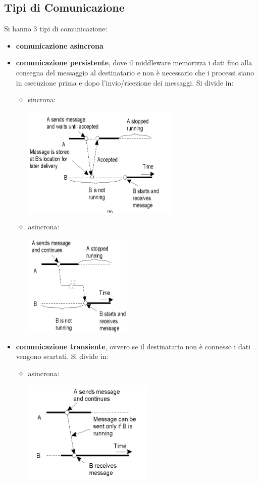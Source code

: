 \message{ !name(sd.tex)}\documentclass[a4paper,12pt, oneside]{book}
\begin{document}
\subsection{Tipi di Comunicazione}
Si hanno 3 tipi di comunicazione:
\begin{itemize}
	\item \textbf{comunicazione asincrona}
	\item \textbf{comunicazione persistente}, dove il middleware memorizza i dati fino alla consegna del messaggio al destinatario e non è necessario che i processi siano in esecuzione prima e dopo l'invio/ricezione dei messaggi. Si divide in:
	\begin{itemize}
		\item sincrona:
		\begin{center}
			\includegraphics[scale=0.8]{img/sin.png}
        \end{center}
		\item asincrona:
		\begin{center}
			\includegraphics[scale=0.8]{img/asin.png}
		\end{center}
	\end{itemize}
	\item \textbf{comunicazione transiente}, ovvero se il destinatario non è connesso i dati vengono scartati. Si divide in:
	\begin{itemize}
		\item asincrona:
		\begin{center}
			\includegraphics[scale=0.8]{img/asin2.png}

\end{center}
\end{itemize}
\end{itemize}
\end{document}
